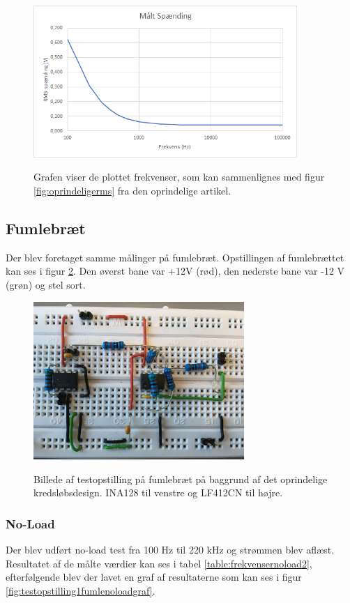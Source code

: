 \begin{figure}[H]
\centering
{\includegraphics[width=10cm]
{Figure/testopstilling1multisimVRMSgraf}}
\caption{Grafen viser de plottet frekvenser, som kan sammenlignes med figur \ref{fig:oprindeligerms} fra den oprindelige artikel.}
\label{fig:testopstilling1multisimVRMSgraf}
\end{figure}








\subsection{Fumlebræt}

Der blev foretaget samme målinger på fumlebræt. Opstillingen af fumlebrættet kan ses i figur \ref{fig:oprindeligekredslob2}. Den øverst bane var +12V (rød), den nederste bane var -12 V (grøn) og stel sort.  


\begin{figure}[H]
\centering
{\includegraphics[width=8cm]
{Figure/oprindeligekredslob2}}
\caption{Billede af testopstilling på fumlebræt på baggrund af det oprindelige kredsløbsdesign. INA128 til venstre og LF412CN til højre.}
\label{fig:oprindeligekredslob2}
\end{figure}


\subsubsection{No-Load}
Der blev udført no-load test fra 100 Hz til 220 kHz og strømmen blev aflæst. Resultatet af de målte værdier kan ses i tabel \ref{table:frekvensernoload2}, efterfølgende blev der lavet en graf af resultaterne som kan ses i figur \ref{fig:testopstilling1fumlenoloadgraf}.


